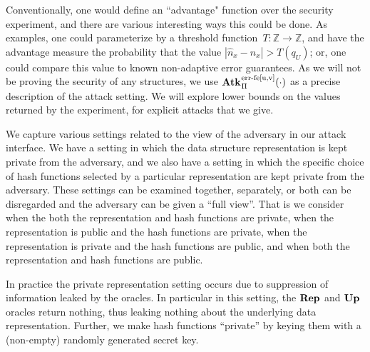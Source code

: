    Conventionally, one would define an ``advantage" function over the security experiment, and there are various interesting ways this could be done. As examples, 
   one could parameterize by a threshold function~$T \colon \mathbb{Z}\to\mathbb{Z}$, and have the advantage measure the probability that the value $|\hat{n}_x - n_x| > T(q_U)$; 
   or, one could compare this value to known non-adaptive error guarantees.  As we will not be proving the security of any structures, 
   we use $\ExpErrFe{\struct}{\cdot}{u,v}$ as a precise description of the attack setting.  We will explore lower bounds on the values returned by the experiment,
   for explicit attacks that we give. 
   
   We capture various settings related to the view of the adversary in our attack interface. We have a setting in which the data structure representation is kept private from the adversary, and we also have a setting in which the specific choice of hash functions selected by a particular representation are kept private from the adversary.  These settings can be examined together, separately, or both can be disregarded and the adversary can be given a ``full view''. That is we consider when the both the representation and hash functions are private, when the representation is public and the hash functions are private, when the representation is private and the hash functions are public, and when both the representation and hash functions are public.
   
   In practice the private representation setting occurs due to suppression of information leaked by the oracles. In particular in this setting, the $\textup{\textbf{Rep}}\hspace{0.5pt}$ and $\textup{\textbf{Up}}\hspace{0.5pt}$ oracles return nothing, thus leaking nothing about the underlying data representation. Further, we make hash functions ``private'' by keying them with a (non-empty) randomly generated secret key. 
   